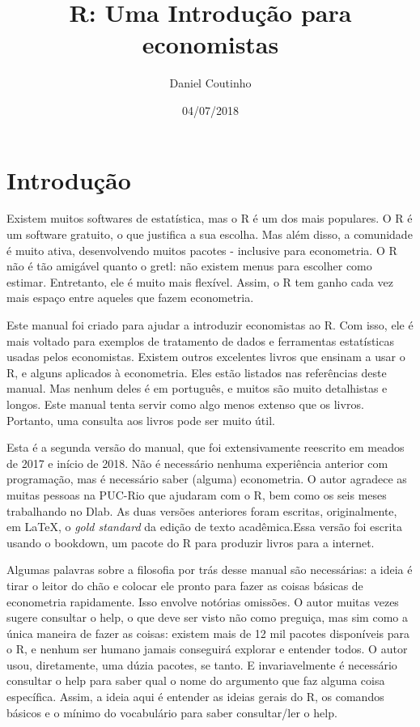 \documentclass[]{book}
\title{R: Uma Introdução para economistas}
\author{Daniel Coutinho}
\date{04/07/2018}
\begin{document}
\maketitle

{
\setcounter{tocdepth}{1}
\tableofcontents
}
\chapter{Introdução}\label{introducao}

Existem muitos softwares de estatística, mas o R é um dos mais
populares. O R é um software gratuito, o que justifica a sua escolha.
Mas além disso, a comunidade é muito ativa, desenvolvendo muitos pacotes
- inclusive para econometria. O R não é tão amigável quanto o gretl: não
existem menus para escolher como estimar. Entretanto, ele é muito mais
flexível. Assim, o R tem ganho cada vez mais espaço entre aqueles que
fazem econometria.

Este manual foi criado para ajudar a introduzir economistas ao R. Com
isso, ele é mais voltado para exemplos de tratamento de dados e
ferramentas estatísticas usadas pelos economistas. Existem outros
excelentes livros que ensinam a usar o R, e alguns aplicados à
econometria. Eles estão listados nas referências deste manual. Mas
nenhum deles é em português, e muitos são muito detalhistas e longos.
Este manual tenta servir como algo menos extenso que os livros.
Portanto, uma consulta aos livros pode ser muito útil.

Esta é a segunda versão do manual, que foi extensivamente reescrito em
meados de 2017 e início de 2018. Não é necessário nenhuma experiência
anterior com programação, mas é necessário saber (alguma) econometria. O
autor agradece as muitas pessoas na PUC-Rio que ajudaram com o R, bem
como os seis meses trabalhando no Dlab. As duas versões anteriores foram
escritas, originalmente, em LaTeX, o \emph{gold standard} da edição de
texto acadêmica.Essa versão foi escrita usando o bookdown, um pacote do
R para produzir livros para a internet.

Algumas palavras sobre a filosofia por trás desse manual são
necessárias: a ideia é tirar o leitor do chão e colocar ele pronto para
fazer as coisas básicas de econometria rapidamente. Isso envolve
notórias omissões. O autor muitas vezes sugere consultar o help, o que
deve ser visto não como preguiça, mas sim como a única maneira de fazer
as coisas: existem mais de 12 mil pacotes disponíveis para o R, e nenhum
ser humano jamais conseguirá explorar e entender todos. O autor usou,
diretamente, uma dúzia pacotes, se tanto. E invariavelmente é necessário
consultar o help para saber qual o nome do argumento que faz alguma
coisa específica. Assim, a ideia aqui é entender as ideias gerais do R,
os comandos básicos e o mínimo do vocabulário para saber consultar/ler o
help.
\end{document}
